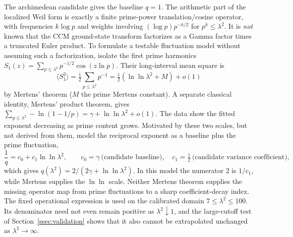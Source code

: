\documentclass[11pt,a4paper]{article}
\begin{document}
The archimedean candidate gives the baseline $q=1$. The arithmetic part of the
localized Weil form is exactly a finite prime-power translation/cosine operator,
with frequencies $k\log p$ and weights involving
$(\log p)p^{-k/2}$ for $p^k\le\lambda^2$. It is \emph{not} known that the CCM
ground-state transform factorizes as a Gamma factor times a truncated Euler
product. To formulate a testable fluctuation model without assuming such a
factorization, isolate the first prime harmonics
$S_1(z)=\sum_{p\le\lambda^2}p^{-1/2}\cos(z\ln p)$. Their long-interval mean
square is
\[
  \langle S_1^2\rangle=\tfrac12\sum_{p\le\lambda^2}p^{-1}
  =\tfrac12(\ln\ln\lambda^2+M)+o(1)
\]
by Mertens' theorem ($M$ the prime Mertens constant). A separate classical
identity, Mertens' product theorem, gives
$\sum_{p\le\lambda^2}-\ln(1-1/p)=\gamma+\ln\ln\lambda^2+o(1)$.
The data show the fitted exponent decreasing as prime content grows. Motivated
by these two scales, but not derived from them, model the reciprocal exponent
as a baseline plus the prime fluctuation,
\begin{equation}\label{eq:q}
  \frac1q = c_0+c_1\ln\ln\lambda^2,\qquad
  c_0=\gamma\ \text{(candidate baseline)},\quad
  c_1=\tfrac12\ \text{(candidate variance coefficient)},
\end{equation}
which gives $q(\lambda^2)=2/(2\gamma+\ln\ln\lambda^2)$. In this model the
numerator $2$ is $1/c_1$, while Mertens supplies the $\ln\ln$ scale. Neither
Mertens theorem supplies the missing operator map from prime fluctuations to a
sharp coefficient-decay index. The fixed operational expression is used on
the calibrated domain $7\le\lambda^2\le100$. Its denominator need not even
remain positive as $\lambda^2\downarrow1$, and the large-cutoff test of
Section~\ref{ssec:validation} shows that it also cannot be extrapolated
unchanged as $\lambda^2\to\infty$.
\end{document}
